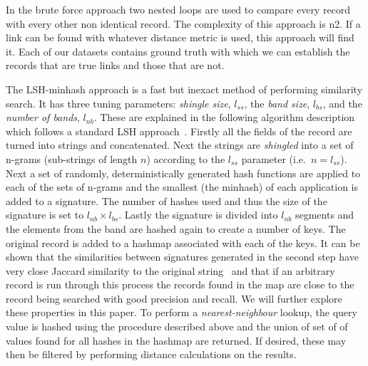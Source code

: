 \documentclass{llncs}
\begin{document}
In the brute force approach two nested loops are used to compare every 
record with every other non identical record. The complexity of this 
approach is n2. If a link can be found with whatever distance metric is 
used, this approach will find it.
Each of our datasets contains ground truth with which we can establish
the records that are true links and those that are not. 

The LSH-minhash approach is a fast but inexact method of performing similarity search. It has three tuning parameters:
\emph{shingle size}, $l_{ss}$, the \emph{band size}, $l_{bs}$, and the
\emph{number of bands}, $l_{nb}$. These are explained in the following algorithm description which follows a standard LSH approach~\cite{??}.
Firstly all the fields of the record are turned into strings and 
concatenated. Next the strings are \emph{shingled} into a set of
n-grams (sub-strings of length $n$) according to the $l_{ss}$
parameter (i.e.\ $n = l_{ss}$). Next a set of randomly, 
deterministically generated hash functions are applied to each of the
sets of n-grams and the smallest (the minhash) of each application is
added to a signature. The number of hashes used and thus the size of
the signature is set to $l_{nb} \times l_{bs}$.
Lastly the signature is divided into $l_{nb}$ segments and the elements from the band are hashed again to create a number of keys.
The original record is added to a hashmap associated with each of the keys. It can be shown that the similarities between signatures generated in the second step have very close Jaccard similarity to the original string~\cite{lsh ref} and that if an arbitrary record is run through
this process the records found in the map are close to the record being searched with good precision and recall. We will further explore these properties in this paper.
To perform a {\textit{nearest-neighbour}} lookup, the query value is hashed using the procedure described above and the union of set of of values found for all hashes in the hashmap are returned. If desired, these may then be filtered by performing distance calculations on the results.
\end{document}
